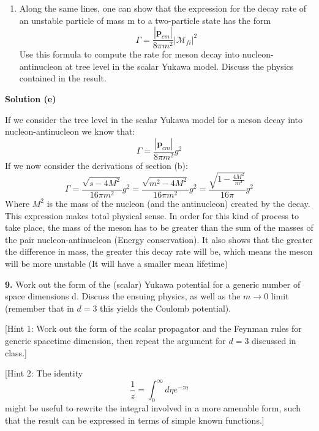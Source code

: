 \documentclass[12pt]{article}
\begin{document}
\color{black}

\begin{enumerate}[label=(\alph*), start = 5]
    \item Along the same lines, one can show that the expression for the decay rate of an unstable particle of mass m to a two-particle state has the form
        \[
            \Gamma = \frac{\left|\mathbf{p}_{cm}\right|}{8\pi m^2}\left|\mathcal{M}_{fi}\right|^2
        \]
        Use this formula to compute the rate for meson decay into nucleon-antinucleon at tree level in the scalar Yukawa model. Discuss the physics contained in the result.
\end{enumerate}

\color{blue}

\textbf{Solution (e)}

If we consider the tree level in the scalar Yukawa model for a meson decay into nucleon-antinucleon we know that:
\[
    \Gamma = \frac{\left|\mathbf{p}_{cm}\right|}{8\pi m^2}g^2
\]
If we now consider the derivations of section (b):
\[
    \Gamma = \frac{\sqrt{s-4M^2}}{16\pi m^2}g^2 = \frac{\sqrt{m^2-4M^2}}{16\pi m^2}g^2 = \frac{\sqrt{1-\frac{4M^2}{m²}}}{16\pi}g^2
\]
Where $M^2$ is the mass of the nucleon (and the antinucleon) created by the decay. This expression makes total physical sense. In order for this kind of process to take place, the mass of the meson has to be greater than the sum of the masses of the pair nucleon-antinucleon (Energy conservation). It also shows that the greater the difference in mass, the greater this decay rate will be, which means the meson will be more unstable (It will have a smaller mean lifetime)

\color{black}


\textbf{9. } Work out the form of the (scalar) Yukawa potential for a generic number of space dimensions d. Discuss the ensuing physics, as well as the $m\rightarrow0$ limit (remember that in $d=3$ this yields the Coulomb potential).

\vspace{0.25cm}

[Hint 1: Work out the form of the scalar propagator and the Feynman rules for generic spacetime dimension, then repeat the argument for $d=3$ discussed in class.]

\vspace{0.25cm}

[Hint 2: The identity
\begin{equation*}
    \frac{1}{z} = \int_0^\infty d\eta e^{-z\eta}
\end{equation*}
might be useful to rewrite the integral involved in a more amenable form, such that the result can be expressed in terms of simple known functions.]
\end{document}
